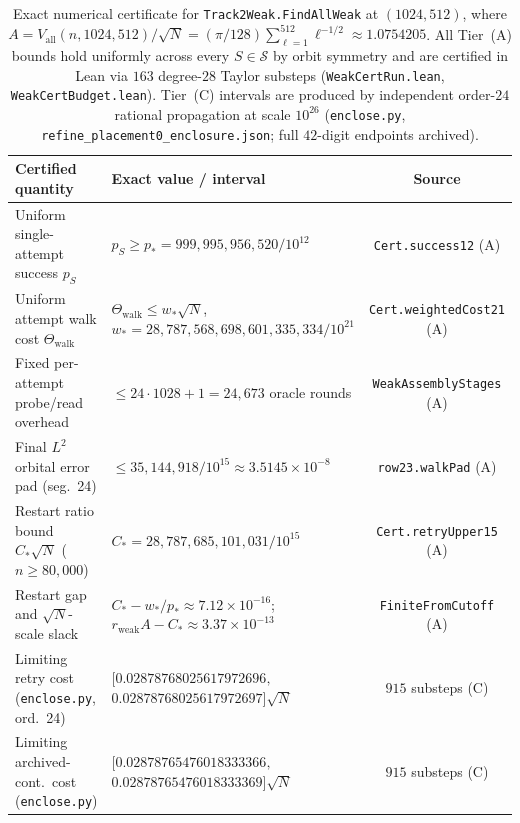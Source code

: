 \documentclass[11pt,a4paper]{article}
\newcommand{\RA}{\raggedright\arraybackslash}
\theoremstyle{definition}
\theoremstyle{remark}
\begin{document}
\begin{table}[htbp]
\centering\small
\setlength{\tabcolsep}{4pt}
\begin{tabular}{@{}>{\RA}p{4.8cm}>{\RA}p{6.4cm}c@{}}
\toprule
Certified quantity & Exact value / interval & Source \\
\midrule
Uniform single-attempt success \(p_S\) & \(p_S \ge p_* = 999{,}995{,}956{,}520 / 10^{12}\) & \texttt{Cert.success12} (A) \\
Uniform attempt walk cost \(\Theta_{\mathrm{walk}}\) & \(\Theta_{\mathrm{walk}} \le w_*\sqrt{N}\), \(w_* = 28{,}787{,}568{,}698{,}601{,}335{,}334 / 10^{21}\) & \texttt{Cert.weightedCost21} (A) \\
Fixed per-attempt probe/read overhead & \(\le 24 \cdot 1028 + 1 = 24{,}673\) oracle rounds & \texttt{WeakAssemblyStages} (A) \\
Final \(L^2\) orbital error pad (seg.~24) & \(\le 35{,}144{,}918 / 10^{15} \approx 3.5145 \times 10^{-8}\) & \texttt{row23.walkPad} (A) \\
Restart ratio bound \(C_*\sqrt{N}\) (\(n \ge 80{,}000\)) & \(C_* = 28{,}787{,}685{,}101{,}031 / 10^{15}\) & \texttt{Cert.retryUpper15} (A) \\
Restart gap and \(\sqrt{N}\)-scale slack & \(C_* - w_*/p_* \approx 7.12 \times 10^{-16}\); \(r_{\mathrm{weak}} A - C_* \approx 3.37 \times 10^{-13}\) & \texttt{FiniteFromCutoff} (A) \\
\midrule
Limiting retry cost (\texttt{enclose.py}, ord.~24) & \([0.02878768025617972696,\) \(0.02878768025617972697]\sqrt{N}\) & \(915\) substeps (C) \\
Limiting archived-cont.\ cost (\texttt{enclose.py}) & \([0.02878765476018333366,\) \(0.02878765476018333369]\sqrt{N}\) & \(915\) substeps (C) \\
\bottomrule
\end{tabular}
\caption{Exact numerical certificate for \texttt{Track2Weak.FindAllWeak} at \((1024,512)\), where \(A = V_{\mathrm{all}}(n,1024,512)/\sqrt{N} = (\pi/128)\sum_{\ell=1}^{512} \ell^{-1/2} \approx 1.0754205\). All Tier~(A) bounds hold uniformly across every \(S \in \mathcal{S}\) by orbit symmetry and are certified in Lean via \(163\) degree-\(28\) Taylor substeps (\texttt{WeakCertRun.lean}, \texttt{WeakCertBudget.lean}). Tier~(C) intervals are produced by independent order-\(24\) rational propagation at scale \(10^{26}\) (\texttt{enclose.py}, \texttt{refine\_placement0\_enclosure.json}; full \(42\)-digit endpoints archived).}
\label{tab:weak-cert}
\end{table}
\end{document}

